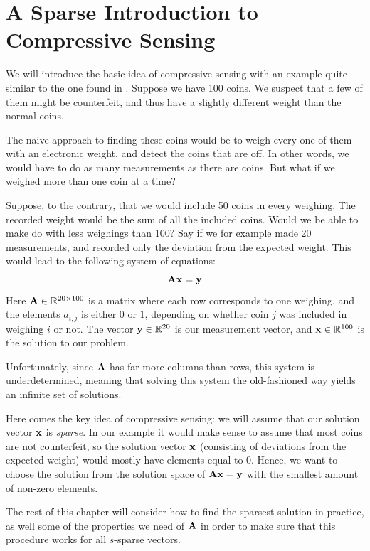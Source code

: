 \chapter{A Sparse Introduction to Compressive Sensing}
\label{sec:basic_cs}

We will introduce the basic idea of compressive sensing with an example quite similar to the one found in \cite{bryan13makingdo}. Suppose we have 100 coins. We suspect that a few of them might be counterfeit, and thus have a slightly different weight than the normal coins. 

The naive approach to finding these coins would be to weigh every one of them with an electronic weight, and detect the coins that are off. In other words, we would have to do as many measurements as there are coins. But what if we weighed more than one coin at a time?

Suppose, to the contrary, that we would include 50 coins in every weighing. The recorded weight would be the sum of all the included coins. Would we be able to make do with less weighings than 100? Say if we for example made 20 measurements, and recorded only the deviation from the expected weight. This would lead to the following system of equations:
\[
	\mathbf{A}\mathbf{x} = \mathbf{y}
\]
Here $ \mathbf{A} \in \mathbb{R}^{20 \times 100} $ is a matrix where each row corresponds to one weighing, and the elements $ a_{i,j} $ is either $ 0 $ or $ 1 $, depending on whether coin $ j $ was included in weighing $ i $ or not. The vector $ \mathbf{y} \in \mathbb{R}^{20} $ is our measurement vector, and $ \mathbf{x} \in \mathbb{R}^{100} $ is the solution to our problem. 

Unfortunately, since $ \mathbf{A} $ has far more columns than rows, this system is underdetermined, meaning that solving this system the old-fashioned way yields an infinite set of solutions. 

Here comes the key idea of compressive sensing: we will assume that our solution vector $ \mathbf{x} $ is \textit{sparse}. In our example it would make sense to assume that most coins are not counterfeit, so the solution vector $ \mathbf{x} $ (consisting of deviations from the expected weight) would mostly have elements equal to $ 0 $. Hence, we want to choose the solution from the solution space of $ \mathbf{A}\mathbf{x} = \mathbf{y} $ with the smallest amount of non-zero elements.

The rest of this chapter will consider how to find the sparsest solution in practice, as well some of the properties we need of $ \mathbf{A} $ in order to make sure that this procedure works for all $ s $-sparse vectors. 







